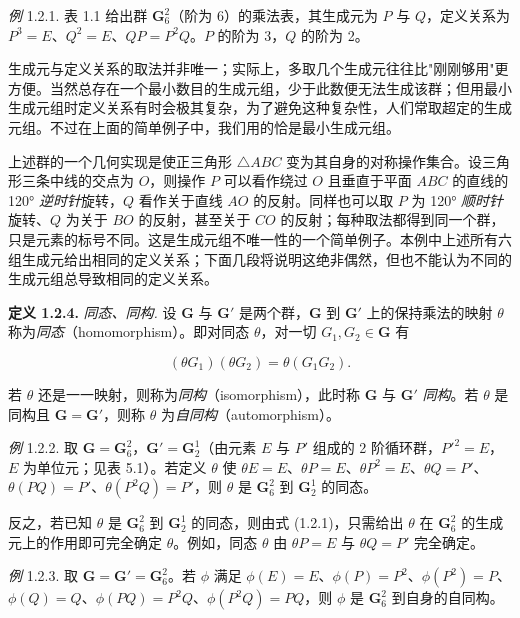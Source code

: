 \textit{例} 1.2.1. 表 1.1 给出群 $\mathbf{G}_6^2$（阶为 6）的乘法表，其生成元为 $P$ 与 $Q$，定义关系为 $P^{3} = E$、$Q^{2} = E$、$QP = P^{2}Q$。$P$ 的阶为 3，$Q$ 的阶为 2。

生成元与定义关系的取法并非唯一；实际上，多取几个生成元往往比"刚刚够用"更方便。当然总存在一个最小数目的生成元组，少于此数便无法生成该群；但用最小生成元组时定义关系有时会极其复杂，为了避免这种复杂性，人们常取超定的生成元组。不过在上面的简单例子中，我们用的恰是最小生成元组。

上述群的一个几何实现是使正三角形 $\triangle ABC$ 变为其自身的对称操作集合。设三角形三条中线的交点为 $O$，则操作 $P$ 可以看作绕过 $O$ 且垂直于平面 $ABC$ 的直线的 120° \textit{逆时针}旋转，$Q$ 看作关于直线 $AO$ 的反射。同样也可以取 $P$ 为 120° \textit{顺时针}旋转、$Q$ 为关于 $BO$ 的反射，甚至关于 $CO$ 的反射；每种取法都得到同一个群，只是元素的标号不同。这是生成元组不唯一性的一个简单例子。本例中上述所有六组生成元给出相同的定义关系；下面几段将说明这绝非偶然，但也不能认为不同的生成元组总导致相同的定义关系。

\textbf{定义 1.2.4.} \textit{同态、同构.} 设 $\mathbf{G}$ 与 $\mathbf{G}'$ 是两个群，$\mathbf{G}$ 到 $\mathbf{G}'$ 上的保持乘法的映射 $\theta$ 称为\textit{同态}（homomorphism）。即对同态 $\theta$，对一切 $G_{1}, G_{2} \in \mathbf{G}$ 有

\begin{equation*}
(\theta G_{1})(\theta G_{2}) = \theta(G_{1}G_{2}). \tag{1.2.1}
\end{equation*}

若 $\theta$ 还是一一映射，则称为\textit{同构}（isomorphism），此时称 $\mathbf{G}$ 与 $\mathbf{G}'$ \textit{同构}。若 $\theta$ 是同构且 $\mathbf{G} = \mathbf{G}'$，则称 $\theta$ 为\textit{自同构}（automorphism）。

\textit{例} 1.2.2. 取 $\mathbf{G} = \mathbf{G}_6^2$，$\mathbf{G}' = \mathbf{G}_2^1$（由元素 $E$ 与 $P'$ 组成的 2 阶循环群，$P'^{2} = E$，$E$ 为单位元；见表 5.1）。若定义 $\theta$ 使 $\theta E = E$、$\theta P = E$、$\theta P^{2} = E$、$\theta Q = P'$、$\theta(PQ) = P'$、$\theta(P^{2}Q) = P'$，则 $\theta$ 是 $\mathbf{G}_6^2$ 到 $\mathbf{G}_2^1$ 的同态。

反之，若已知 $\theta$ 是 $\mathbf{G}_6^2$ 到 $\mathbf{G}_2^1$ 的同态，则由式 (1.2.1)，只需给出 $\theta$ 在 $\mathbf{G}_6^2$ 的生成元上的作用即可完全确定 $\theta$。例如，同态 $\theta$ 由 $\theta P = E$ 与 $\theta Q = P'$ 完全确定。

\textit{例} 1.2.3. 取 $\mathbf{G} = \mathbf{G}' = \mathbf{G}_6^2$。若 $\phi$ 满足 $\phi(E) = E$、$\phi(P) = P^{2}$、$\phi(P^{2}) = P$、$\phi(Q) = Q$、$\phi(PQ) = P^{2}Q$、$\phi(P^{2}Q) = PQ$，则 $\phi$ 是 $\mathbf{G}_6^2$ 到自身的自同构。

